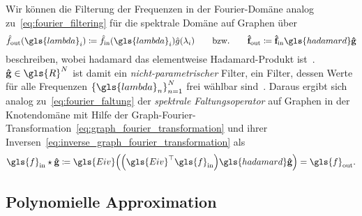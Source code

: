 Wir können die Filterung der Frequenzen in der Fourier-Domäne analog zu~\eqref{eq:fourier_filtering} für die spektrale Domäne auf Graphen über
\begin{equation*}
  \hat f_{\mathrm{out}}\left(\gls{lambda}_i\right) \coloneqq \hat f_{\mathrm{in}}\left(\gls{lambda}_i\right)\hat g\left(\lambda_i\right)
  \qquad
  \text{\bzw{}}
  \qquad
  \ve{\hat f}_{\mathrm{out}} \coloneqq \ve{\hat f}_{\mathrm{in}} \gls{hadamard} \ve{\hat g}
\end{equation*}
beschreiben, wobei \gls{hadamard} das elementweise Hadamard-Produkt ist~\cite{Shuman}.
$\ve{\hat g} \in \gls{R}^N$ ist damit ein \emph{nicht-parametrischer} Filter, \dhe{} ein Filter, dessen Werte für alle Frequenzen ${\left\{\gls{lambda}_n\right\}}_{n=1}^N$ frei wählbar sind~\cite{Defferrard}.
Daraus ergibt sich analog zu~\eqref{eq:fourier_faltung} der \emph{spektrale Faltungsoperator} auf Graphen in der Knotendomäne mit Hilfe der Graph-Fourier-Transformation~\eqref{eq:graph_fourier_transformation} und ihrer Inversen~\eqref{eq:inverse_graph_fourier_transformation} als~\cite{Shuman, Defferrard}
\begin{equation}
  \gls{f}_{\mathrm{in}} \star \ve{\hat g} \coloneqq \gls{Eiv}\left(\left(\gls{Eiv}^{\top}\gls{f}_{\mathrm{in}}\right) \gls{hadamard} \ve{\hat g}\right) = \gls{f}_{\mathrm{out}}.
  \label{eq:spektraler_faltungsoperator}
\end{equation}

\subsection{Polynomielle Approximation}
\label{polynomielle_approximation}

